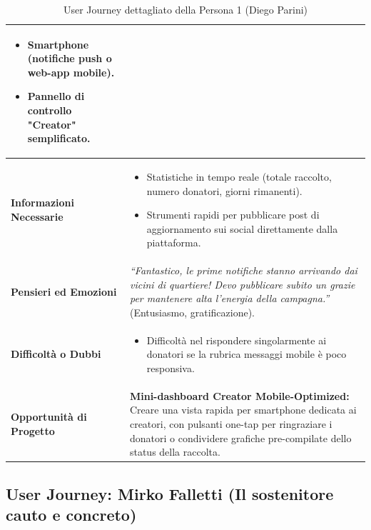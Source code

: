 \documentclass[11pt,a4paper]{article}
\begin{document}
\begin{table}[h!]
\begin{tabular}{|p{3.2cm}|p{11.8cm}|}
\begin{itemize}[leftmargin=*,nosep]
    \item Smartphone (notifiche push o web-app mobile).
    \item Pannello di controllo "Creator" semplificato.
\end{itemize} \\ \hline
\textbf{Informazioni Necessarie} &
\begin{itemize}[leftmargin=*,nosep]
    \item Statistiche in tempo reale (totale raccolto, numero donatori, giorni rimanenti).
    \item Strumenti rapidi per pubblicare post di aggiornamento sui social direttamente dalla piattaforma.
\end{itemize} \\ \hline
\textbf{Pensieri ed Emozioni} &
\textit{``Fantastico, le prime notifiche stanno arrivando dai vicini di quartiere! Devo pubblicare subito un grazie per mantenere alta l'energia della campagna.''} (Entusiasmo, gratificazione). \\ \hline
\textbf{Difficoltà o Dubbi} &
\begin{itemize}[leftmargin=*,nosep]
    \item Difficoltà nel rispondere singolarmente ai donatori se la rubrica messaggi mobile è poco responsiva.
\end{itemize} \\ \hline
\textbf{Opportunità di Progetto} &
\textbf{Mini-dashboard Creator Mobile-Optimized:} Creare una vista rapida per smartphone dedicata ai creatori, con pulsanti one-tap per ringraziare i donatori o condividere grafiche pre-compilate dello status della raccolta. \\ \hline
\end{tabular}
\caption{User Journey dettagliato della Persona 1 (Diego Parini)}
\label{tab:user_journey_diego}
\end{table}


\subsection{User Journey: Mirko Falletti (Il sostenitore cauto e concreto)}
\end{document}

